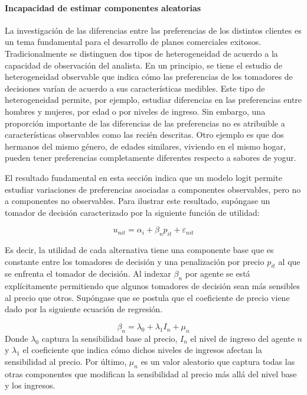 \documentclass[
]{book}
\begin{document}
\paragraph*{Incapacidad de estimar componentes aleatorias}\label{incapacidad-de-estimar-componentes-aleatorias}

La investigación de las diferencias entre las preferencias de los distintos clientes es un tema fundamental para el desarrollo de planes comerciales exitosos. Tradicionalmente se distinguen dos tipos de heterogeneidad de acuerdo a la capacidad de observación del analista. En un principio, se tiene el estudio de heterogeneidad observable que indica cómo las preferencias de los tomadores de decisiones varían de acuerdo a sus características medibles. Este tipo de heterogeneidad permite, por ejemplo, estudiar diferencias en las preferencias entre hombres y mujeres, por edad o por niveles de ingreso. Sin embargo, una proporción importante de las diferencias de las preferencias no es atribuible a características observables como las recién descritas. Otro ejemplo es que dos hermanos del mismo género, de edades similares, viviendo en el mismo hogar, pueden tener preferencias completamente diferentes respecto a sabores de yogur.

El resultado fundamental en esta sección indica que un modelo logit permite estudiar variaciones de preferencias asociadas a componentes observables, pero no a componentes no observables.
Para ilustrar este resultado, supóngase un tomador de decisión caracterizado por la siguiente función de utilidad:

\[u_{nit} = \alpha_i + \beta_np_{it} + \varepsilon_{nit}\]

Es decir, la utilidad de cada alternativa tiene una componente base que es constante entre los tomadores de decisión y una penalización por precio \(p_{it}\) al que se enfrenta el tomador de decisión. Al indexar \(β_n\) por agente se está explícitamente permitiendo que algunos tomadores de decisión sean más sensibles al precio que otros. Supóngase que se postula que el coeficiente de precio viene dado por la siguiente ecuación de regresión.

\[\beta_n = \lambda_0 + \lambda_1I_n + \mu_n\]
Donde \(\lambda_0\) captura la sensibilidad base al precio, \(I_n\) el nivel de ingreso del agente \(n\) y \(\lambda_1\) el coeficiente que indica cómo dichos niveles de ingresos afectan la sensibilidad al precio. Por último, \(\mu_n\) es un valor aleatorio que captura todas las otras componentes que modifican la sensibilidad al precio más allá del nivel base y los ingresos.
\end{document}
